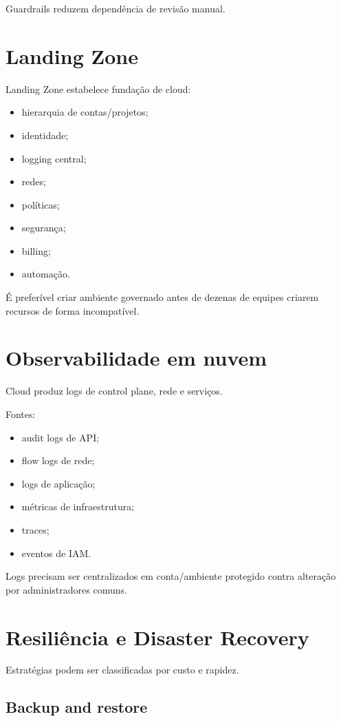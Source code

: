 Guardrails reduzem dependência de revisão manual.

\section{Landing Zone}

Landing Zone estabelece fundação de cloud:
\begin{itemize}
\item hierarquia de contas/projetos;
\item identidade;
\item logging central;
\item redes;
\item políticas;
\item segurança;
\item billing;
\item automação.
\end{itemize}

É preferível criar ambiente governado antes de dezenas de equipes criarem recursos de forma incompatível.

\section{Observabilidade em nuvem}

Cloud produz logs de control plane, rede e serviços.

Fontes:
\begin{itemize}
\item audit logs de API;
\item flow logs de rede;
\item logs de aplicação;
\item métricas de infraestrutura;
\item traces;
\item eventos de IAM.
\end{itemize}

Logs precisam ser centralizados em conta/ambiente protegido contra alteração por administradores comuns.

\section{Resiliência e Disaster Recovery}

Estratégias podem ser classificadas por custo e rapidez.

\subsection{Backup and restore}

